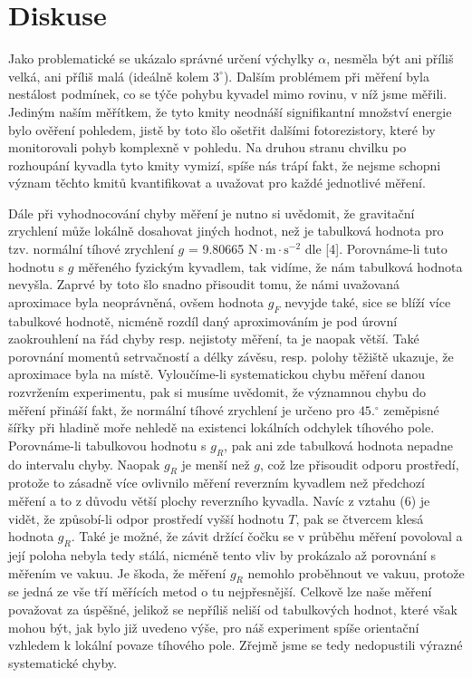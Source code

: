 \documentclass{article}
\begin{document}
\section*{Diskuse}
\par Jako problematické se ukázalo správné určení výchylky $\alpha$, nesměla být ani příliš velká, ani příliš malá (ideálně kolem $3^{\circ}$). Dalším problémem při měření byla nestálost podmínek, co se týče pohybu kyvadel mimo rovinu, v níž jsme měřili. Jediným naším měřítkem, že tyto kmity neodnáší signifikantní množství energie bylo ověření pohledem, jistě by toto šlo ošetřit dalšími fotorezistory, které by monitorovali pohyb komplexně v pohledu. Na druhou stranu chvilku po rozhoupání kyvadla tyto kmity vymizí, spíše nás trápí fakt, že nejsme schopni význam těchto kmitů kvantifikovat a uvažovat pro každé jednotlivé měření.
\par Dále při vyhodnocování chyby měření je nutno si uvědomit, že gravitační zrychlení může lokálně dosahovat jiných hodnot, než je tabulková hodnota pro tzv. normální tíhové zrychlení $g$ = 9.80665 $\mathrm{N \cdot m \cdot s^{-2}}$ dle [4]. Porovnáme-li tuto hodnotu s $g$ měřeného fyzickým kyvadlem, tak vidíme, že nám tabulková hodnota nevyšla. Zaprvé by toto šlo snadno přisoudit tomu, že námi uvažovaná aproximace byla neoprávněná, ovšem hodnota $g_{F}$ nevyjde také, sice se blíží více tabulkové hodnotě, nicméně rozdíl daný aproximováním je pod úrovní zaokrouhlení na řád chyby resp. nejistoty měření, ta je naopak větší. Také porovnání momentů setrvačností a délky závěsu, resp. polohy těžiště ukazuje, že aproximace byla na místě. Vyloučíme-li systematickou chybu měření danou rozvržením experimentu, pak si musíme uvědomit, že významnou chybu do měření přináší fakt, že normální tíhové zrychlení je určeno pro $45.^{\circ}$ zeměpisné šířky při hladině moře nehledě na existenci lokálních odchylek tíhového pole. Porovnáme-li tabulkovou hodnotu s $g_{R}$, pak ani zde tabulková hodnota nepadne do intervalu chyby. Naopak $g_{R}$ je menší než $g$, což lze přisoudit odporu prostředí, protože to zásadně více ovlivnilo měření reverzním kyvadlem než předchozí měření a to z důvodu větší plochy reverzního kyvadla. Navíc z vztahu (6) je vidět, že způsobí-li odpor prostředí vyšší hodnotu $T$, pak se čtvercem klesá hodnota $g_{R}$. Také je možné, že závit držící čočku se v průběhu měření povoloval a její poloha nebyla tedy stálá, nicméně tento vliv by prokázalo až porovnání s měřením ve vakuu. Je škoda, že měření $g_{R}$ nemohlo proběhnout ve vakuu, protože se jedná ze vše tří měřících metod o tu nejpřesnější. Celkově lze naše měření považovat za úspěšné, jelikož se nepříliš neliší od tabulkových hodnot, které však mohou být, jak bylo již uvedeno výše, pro náš experiment spíše orientační vzhledem k lokální povaze tíhového pole. Zřejmě jsme se tedy nedopustili výrazné systematické chyby.
\end{document}

